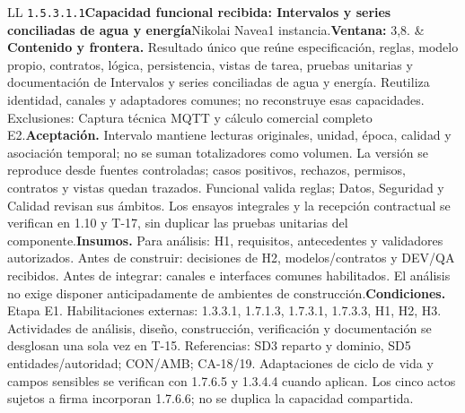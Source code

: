 \begin{longtable}{L{\tabcolsep\relax}L{\tabcolsep\relax}}
\texttt{1.\allowbreak{}5.\allowbreak{}3.\allowbreak{}1.\allowbreak{}1}\newline{}\textbf{Capacidad funcional recibida: Intervalos y series conciliadas de agua y energía}\newline{}Nikolai Navea\newline{}1 instancia.\newline{}\textbf{Ventana:} 3,8. & \textbf{Contenido y frontera.} Resultado único que reúne especificación, reglas, modelo propio, contratos, lógica, persistencia, vistas de tarea, pruebas unitarias y documentación de Intervalos y series conciliadas de agua y energía. Reutiliza identidad, canales y adaptadores comunes; no reconstruye esas capacidades. Exclusiones: Captura técnica MQTT y cálculo comercial completo E2.\newline{}\textbf{Aceptación.} Intervalo mantiene lecturas originales, unidad, época, calidad y asociación temporal; no se suman totalizadores como volumen. La versión se reproduce desde fuentes controladas; casos positivos, rechazos, permisos, contratos y vistas quedan trazados. Funcional valida reglas; Datos, Seguridad y Calidad revisan sus ámbitos. Los ensayos integrales y la recepción contractual se verifican en 1.10 y T-17, sin duplicar las pruebas unitarias del componente.\newline{}\textbf{Insumos.} Para análisis: H1, requisitos, antecedentes y validadores autorizados. Antes de construir: decisiones de H2, modelos/contratos y DEV/QA recibidos. Antes de integrar: canales e interfaces comunes habilitados. El análisis no exige disponer anticipadamente de ambientes de construcción.\newline{}\textbf{Condiciones.} Etapa E1. Habilitaciones externas: 1.3.3.1, 1.7.1.3, 1.7.3.1, 1.7.3.3, H1, H2, H3. Actividades de análisis, diseño, construcción, verificación y documentación se desglosan una sola vez en T-15. Referencias: SD3 reparto y dominio, SD5 entidades/autoridad; CON/AMB; CA-18/19. Adaptaciones de ciclo de vida y campos sensibles se verifican con 1.7.6.5 y 1.3.4.4 cuando aplican. Los cinco actos sujetos a firma incorporan 1.7.6.6; no se duplica la capacidad compartida.\\\hline

\end{longtable}
